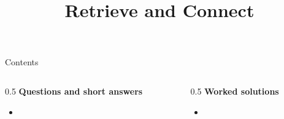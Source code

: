 \documentclass[aspectratio=169]{beamer}
\title{Retrieve and Connect}
\author{}
\date{}
\begin{document}
\frame{\titlepage}

\begin{frame}{Contents}
\small
\begin{columns}[T]
  \begin{column}{0.5\textwidth}
    \textbf{Questions and short answers}
    \begin{itemize}
      \item \hyperlink{q-st1}{}
    \end{itemize}
  \end{column}
  \begin{column}{0.5\textwidth}
    \textbf{Worked solutions}
    \begin{itemize}
      \item \hyperlink{work-st1}{}
    \end{itemize}
  \end{column}
\end{columns}
\end{frame}
\end{document}
